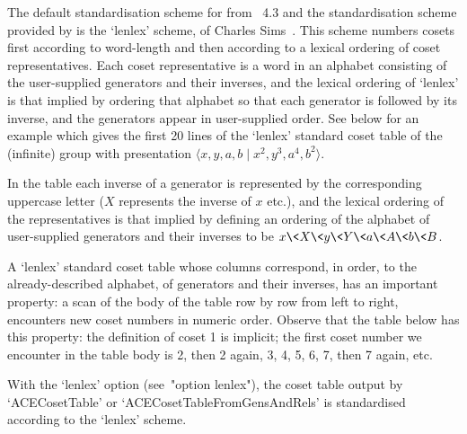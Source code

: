 
The default standardisation scheme for {\GAP} from {\GAP}~4.3 and  the
standardisation scheme provided by {\ACE} is the `lenlex'  scheme,  of
Charles Sims~\cite{Sim94}. This scheme numbers cosets first  according
to word-length and then according  to  a  lexical  ordering  of  coset
representatives. Each coset representative is a word  in  an  alphabet
consisting of the user-supplied generators and their inverses, and the
lexical ordering of `lenlex' is that implied by ordering that alphabet
so that each generator is followed by its inverse, and the  generators
appear in user-supplied order. See below for an  example  which  gives
the first 20 lines  of  the  `lenlex'  standard  coset  table  of  the
(infinite) group with presentation $\langle x, y, a, b \mid x^2,  y^3,
a^4, b^2\rangle$.

In the table each  inverse  of  a  generator  is  represented  by  the
corresponding uppercase letter ($X$  represents  the  inverse  of  $x$
etc.), and the lexical ordering of the representatives is that implied
by defining an ordering of the alphabet  of  user-supplied  generators
and  their  inverses  to  be  $x\<X\<y\<Y\<a\<A\<b\<B$.  

A `lenlex' standard coset table whose columns correspond, in order, to
the already-described alphabet, of generators and their inverses,  has
an important property: a scan of the body of the table row by row from
left to right, encounters new coset numbers in numeric order.  Observe
that the table below has this property: the definition of coset  1  is
implicit; the first coset number we encounter in the table body is  2,
then 2 again, 3, 4, 5, 6, 7, then 7 again, etc.

With the `lenlex' option (see~"option lenlex"), the coset table output
by `ACECosetTable' or `ACECosetTableFromGensAndRels'  is  standardised
according to the `lenlex' scheme.

